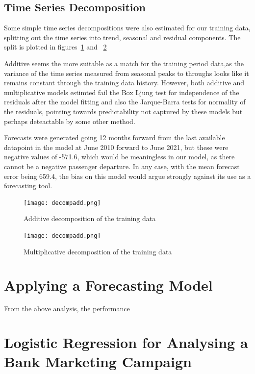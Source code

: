 \documentclass[9pt,technote]{IEEEtran}
\begin{document}
\subsection{Time Series Decomposition}

Some simple time series decompositions were also estimated for our training data, splitting out the time series into trend, seasonal and residual components.  The split is plotted in figures~\ref{fig:DecompAdd} and ~\ref{fig:DecompMult}

Additive seems the more suitable as a match for the training period data,as the variance of the time series measured from seasonal peaks to throughs looks like it remains constant through the training data history.  However, both additive and multiplicative models estimted fail the Box Ljung test for independence of the residuals after the model fitting and also the Jarque-Barra tests for normality of the residuals, pointing towards predictability not captured by these models but perhaps deteactable by some other method.  

Forecasts were generated going 12 months forward from the last available datapoint in the model at June 2010 forward to June 2021, but these were negative values of -571.6, which would be meaningless in our model, as there cannot be a negative passenger departure.  In any case, with the mean forecast error being 659.4, the bias on this model would argue strongly against its use as a forecasting tool.  

\begin{figure}[htbp]
\centerline{\texttt{[image: decompadd.png]}}
\caption{Additive decomposition of the training data}
\label{fig:DecompAdd}
\end{figure}

\begin{figure}[htbp]
\centerline{\texttt{[image: decompadd.png]}}
\caption{Multiplicative decomposition of the training data}
\label{fig:DecompMult}
\end{figure}

\section{Applying a Forecasting Model}

From the above analysis, the performance 

\section{Logistic Regression for Analysing a Bank Marketing Campaign}
\end{document}
